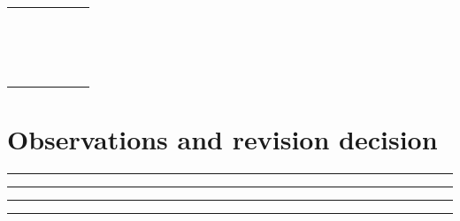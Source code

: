 \documentclass[10pt,letterpaper]{article}
\begin{document}
\begin{longtable}{|p{0.156\linewidth}|p{0.156\linewidth}|p{0.156\linewidth}|p{0.156\linewidth}|p{0.156\linewidth}|}
\rule{0pt}{20pt} &  &  &  & \\\hline
\rule{0pt}{20pt} &  &  &  & \\\hline
\rule{0pt}{20pt} &  &  &  & \\\hline
\rule{0pt}{20pt} &  &  &  & \\\hline
\rule{0pt}{20pt} &  &  &  & \\\hline
\rule{0pt}{20pt} &  &  &  & \\\hline
\rule{0pt}{20pt} &  &  &  & \\\hline
\rule{0pt}{20pt} &  &  &  & \\\hline
\rule{0pt}{20pt} &  &  &  & \\\hline
\rule{0pt}{20pt} &  &  &  & \\\hline
\rule{0pt}{20pt} &  &  &  & \\\hline
\rule{0pt}{20pt} &  &  &  & \\\hline
\rule{0pt}{20pt} &  &  &  & \\\hline
\rule{0pt}{20pt} &  &  &  & \\\hline
\rule{0pt}{20pt} &  &  &  & \\\hline
\rule{0pt}{20pt} &  &  &  & \\\hline
\rule{0pt}{20pt} &  &  &  & \\\hline
\rule{0pt}{20pt} &  &  &  & \\\hline
\end{longtable}
\section{Observations and revision decision}
\noindent\rule{\linewidth}{0.4pt}\par\vspace{18pt}\noindent\rule{\linewidth}{0.4pt}\par\vspace{18pt}\noindent\rule{\linewidth}{0.4pt}\par\vspace{18pt}\noindent\rule{\linewidth}{0.4pt}\par\vspace{18pt}
\end{document}
